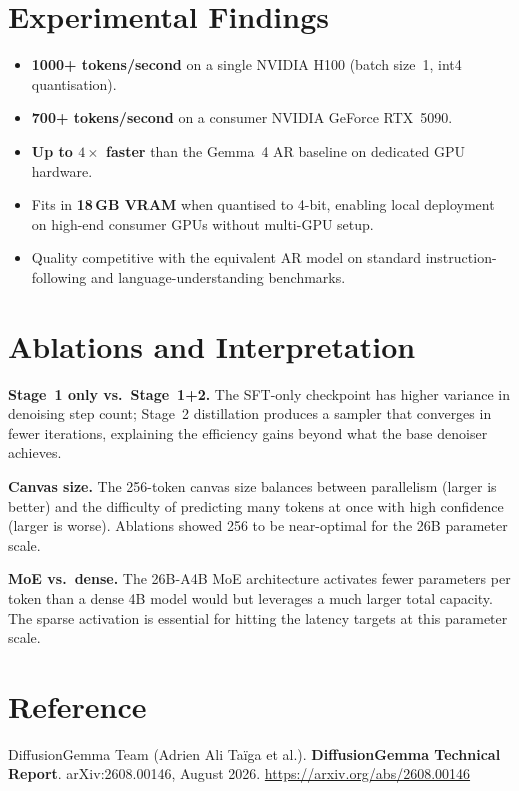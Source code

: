 \documentclass[10pt,twocolumn]{article}
\begin{document}
\section{Experimental Findings}

\begin{itemize}[itemsep=2pt,parsep=0pt]
  \item \textbf{1000+ tokens/second} on a single NVIDIA H100 (batch size~1, int4 quantisation).
  \item \textbf{700+ tokens/second} on a consumer NVIDIA GeForce RTX~5090.
  \item \textbf{Up to $4\times$ faster} than the Gemma~4 AR baseline on dedicated GPU hardware.
  \item Fits in \textbf{18\,GB VRAM} when quantised to 4-bit, enabling local deployment
    on high-end consumer GPUs without multi-GPU setup.
  \item Quality competitive with the equivalent AR model on standard instruction-following
    and language-understanding benchmarks.
\end{itemize}

\section{Ablations and Interpretation}

\textbf{Stage~1 only vs.\ Stage~1+2.} The SFT-only checkpoint has higher variance
in denoising step count; Stage~2 distillation produces a sampler that converges in
fewer iterations, explaining the efficiency gains beyond what the base denoiser achieves.

\textbf{Canvas size.} The 256-token canvas size balances between parallelism (larger
is better) and the difficulty of predicting many tokens at once with high confidence
(larger is worse). Ablations showed 256 to be near-optimal for the 26B parameter scale.

\textbf{MoE vs.\ dense.} The 26B-A4B MoE architecture activates fewer parameters per
token than a dense 4B model would but leverages a much larger total capacity. The sparse
activation is essential for hitting the latency targets at this parameter scale.

\section*{Reference}

DiffusionGemma Team (Adrien Ali Ta\"iga et al.). \textbf{DiffusionGemma Technical Report}.
arXiv:2608.00146, August 2026.
\url{https://arxiv.org/abs/2608.00146}
\end{document}
